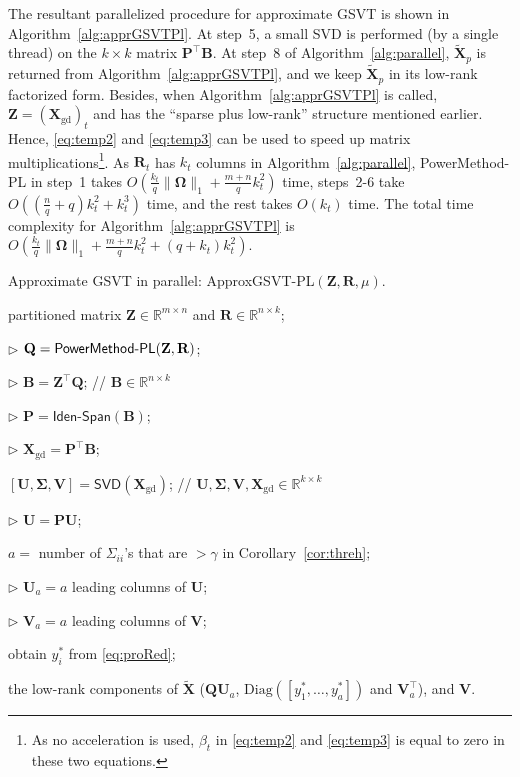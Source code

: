 \documentclass[10pt,journal,compsoc]{IEEEtran}
\def \R{\mathbb R}
\newcommand{\X}{\mathbf{X}}
\newcommand{\NM}[2]{\| #1 \|_{#2} }
\newcommand{\Diag}[1]{\text{Diag}(#1)}
\begin{document}
The resultant parallelized procedure for approximate GSVT is shown in
Algorithm~\ref{alg:apprGSVTPl}.
At step~5,
a small  SVD is performed (by a single thread)
on  the $k \times k$ matrix
	$\mathbf{P}^{\top} \mathbf{B}$.
At step~8 of Algorithm~\ref{alg:parallel},
$\tilde{\X}_p$ is returned from Algorithm~\ref{alg:apprGSVTPl},
and we keep $\tilde{\X}_p$ in its low-rank factorized form.
Besides, when Algorithm~\ref{alg:apprGSVTPl} is called,
$\mathbf{Z} = (\X_{\text{gd}})_t$
and has the ``sparse plus low-rank'' structure mentioned earlier. Hence, \eqref{eq:temp2} and \eqref{eq:temp3} can be used to speed up
matrix multiplications\footnote{As no acceleration is used, $\beta_t$ 
in \eqref{eq:temp2} and \eqref{eq:temp3} 
is equal to zero
in these two equations.}.
As $\mathbf{R}_t$ has $k_t$ columns in Algorithm~\ref{alg:parallel},
\textsf{PowerMethod-PL} in step~1 takes
$O( \frac{k_t}{q} \NM{\mathbf{\Omega}}{1} + \frac{m + n}{q} k_t^2 )$ time, 
steps~2-6 take $O( (\frac{n}{q} + q)k_t^2 + k_t^3 )$ time,
and the rest takes $O(k_t)$ time.
The total time complexity 
for Algorithm~\ref{alg:apprGSVTPl} 
is 
$O( \frac{k_t}{q} \NM{\mathbf{\Omega}}{1} + \frac{m + n}{q} k_t^2 
+ (q + k_t)k_t^2 )$.


\begin{algorithm}[ht]
\caption{Approximate GSVT in parallel:
	\textsf{ApproxGSVT-PL}$(\mathbf{Z}, \mathbf{R}, \mu)$.}
\begin{algorithmic}[1]
	\REQUIRE partitioned matrix $\mathbf{Z} \in \R^{m \times n}$ and $\mathbf{R} \in \R^{n \times k}$;
	
	\STATE $\rhd$ $\mathbf{Q} = \text{\sf PowerMethod-PL}(\mathbf{Z}, \mathbf{R})$;
	
	\STATE $\rhd$ $\mathbf{B} = \mathbf{Z}^{\top} \mathbf{Q}$; 
	// $\mathbf{B} \in \R^{n \times k}$
	
	\STATE $\rhd$ $\mathbf{P} = \textsf{Iden-Span}(\mathbf{B})$;
	
	\STATE $\rhd$ $\X_{\text{gd}} = \mathbf{P}^{\top} \mathbf{B}$;
	
	\STATE $[\mathbf{U}, \mathbf{\Sigma}, \mathbf{V}] = \textsf{SVD}(\X_{\text{gd}})$;
	// $\mathbf{U}, \mathbf{\Sigma}, \mathbf{V}, \X_{\text{gd}} \in \R^{k \times k}$
	
	\STATE $\rhd$ $\mathbf{U} = \mathbf{P} \mathbf{U}$;
	
	\STATE $a = $ number of $\Sigma_{ii}$'s that are $>\gamma$ in Corollary~\ref{cor:threh};
	
	\STATE $\rhd$ $\mathbf{U}_a = a$ leading columns of $\mathbf{U}$;
	
	\STATE $\rhd$ $\mathbf{V}_a = a$ leading columns of $\mathbf{V}$;
	
	\STATE obtain $y^*_i$ from \eqref{eq:proRed};
	\ENDFOR
	
	\RETURN  
	the low-rank components of $\tilde{\mathbf{X}}$
	($\mathbf{Q} \mathbf{U}_a$, $\Diag{[ y_1^*,\dots,y_{a}^* ]}$ and $\mathbf{V}_a^{\top}$),
	and $\mathbf{V}$.
\end{algorithmic}
\label{alg:apprGSVTPl}
\end{algorithm}
\end{document}
